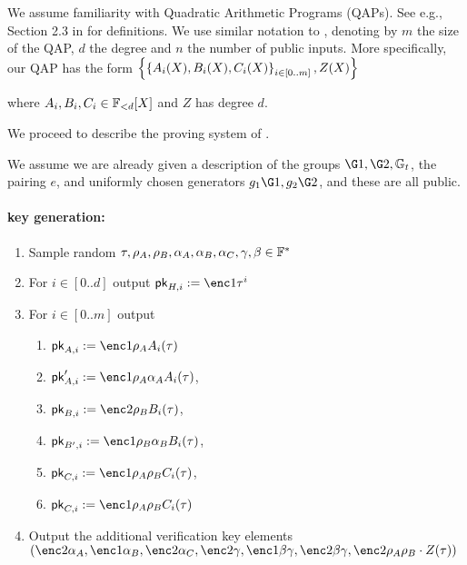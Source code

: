 \documentclass[11pt]{article}
\numberwithin{equation}{section} %
\numberwithin{figure}{section} %
\newcommand{\set}[1]{\ensuremath{\left\{#1\right\}}\xspace}
\begin{document}
We assume familiarity with Quadratic Arithmetic Programs (QAPs). See e.g., Section 2.3 in \cite{groth16} for definitions.
We use similar notation to \cite{BCTV}, denoting by $m$ the size of the QAP, $d$ the degree and $n$ the number of public inputs.
More specifically, our QAP has the form \set{\sett{A_i(X),B_i(X),C_i(X)}{i\in [0..m]}, Z(X)}

where $A_i,B_i,C_i\in \mathbb F_{< d}[X]$ and $Z$ has degree $d$.


We proceed to describe the proving system of \cite{BCTV}.

We assume we are already given a description of the groups $\G1,\G2,\Gt$, the pairing $e$, and uniformly chosen generators 
$g_1\G1,g_2\G2$, and these are all public.
\paragraph{\bctv key generation:}

\begin{enumerate}
 \item Sample random $\tau,\rho_A,\rho_B,\alpha_A,\alpha_B,\alpha_C,\gamma,\beta\in \mathbb F^*$
 \item For $i\in [0..d]$ output $\pk_{H,i}\defeq \enc1{\tau^i}$
 \item For $i\in [0..m]$ output
 
 \begin{enumerate}
  \item $\pk_{A,i}\defeq \enc1{\rho_A A_i(\tau)}$
  
\item  $\pk'_{A,i}\defeq\enc1{\rho_A \alpha_A A_i(\tau)}$,
\item $\pk_{B,i}\defeq\enc2{\rho_B B_i(\tau)}$,
\item $\pk_{B',i}\defeq \enc1{\rho_B \alpha_B B_i(\tau)}$,
\item $\pk_{C,i}\defeq \enc1{\rho_A\rho_B C_i(\tau)}$,
\item $\pk_{C,i}\defeq \enc1{\rho_A\rho_B C_i(\tau)}$ 
\end{enumerate}
\item Output the additional verification key elements $(\enc2{\alpha_A},\enc1{\alpha_B},\enc2{\alpha_C},\enc2{\gamma},\enc1{\beta\gamma},\enc2{\beta\gamma},\enc2{\rho_A\rho_B \cdot Z(\tau)})$
 \end{enumerate}
\end{document}
